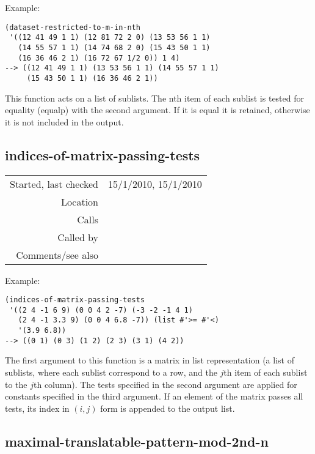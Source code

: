 \vspace{0.5cm}
\noindent Example:
\begin{verbatim}
(dataset-restricted-to-m-in-nth
 '((12 41 49 1 1) (12 81 72 2 0) (13 53 56 1 1)
   (14 55 57 1 1) (14 74 68 2 0) (15 43 50 1 1)
   (16 36 46 2 1) (16 72 67 1/2 0)) 1 4) 
--> ((12 41 49 1 1) (13 53 56 1 1) (14 55 57 1 1)
     (15 43 50 1 1) (16 36 46 2 1))
\end{verbatim}

\noindent This function acts on a list of sublists.
The nth item of each sublist is tested for equality
(equalp) with the second argument. If it is equal it
is retained, otherwise it is not included in the
output.


\subsection*{indices-of-matrix-passing-tests}\label{fun:indices-of-matrix-passing-tests}

\vspace{0.3cm}
\begin{tabular}{r|p{8cm}}
Started, last checked & 15/1/2010, 15/1/2010 \\
Location & \nameref{sec:structural-induction-mod} \\
Calls & \nameref{fun:test-all-true} \\
Called by & \nameref{fun:occurrence-matrixnrel-idx} \\
Comments/see also &
\end{tabular}

\vspace{0.5cm}
\noindent Example:
\begin{verbatim}
(indices-of-matrix-passing-tests
 '((2 4 -1 6 9) (0 0 4 2 -7) (-3 -2 -1 4 1)
   (2 4 -1 3.3 9) (0 0 4 6.8 -7)) (list #'>= #'<) 
   '(3.9 6.8))
--> ((0 1) (0 3) (1 2) (2 3) (3 1) (4 2))
\end{verbatim}

\noindent The first argument to this function is a
matrix in list representation (a list of sublists,
where each sublist correspond to a row, and the $j$th
item of each sublist to the $j$th column). The tests
specified in the second argument are applied for
constants specified in the third argument. If an
element of the matrix passes all tests, its index in
$(i, j)$ form is appended to the output list.


\subsection*{maximal-translatable-pattern-mod-2nd-n}\label{fun:maximal-translatable-pattern-mod-2nd-n}

